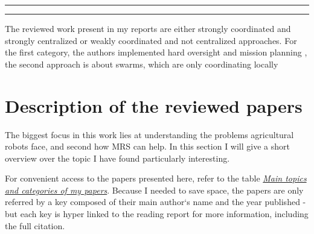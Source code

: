         \vspace{10px}
        \hrule
        \vspace{10px}


        \vspace{10px}
        \hrule
        \vspace{10px}

        The reviewed work present in my reports are either strongly coordinated and strongly centralized or weakly coordinated and not centralized approaches. For the first category, the authors implemented hard oversight and mission planning \cite{deSantos2016}, the second approach is about swarms, which are only coordinating locally \cite{Albani2019}



    \chapter{Description of the reviewed papers}

    The biggest focus in this work lies at understanding the problems agricultural robots face, and second how MRS can help. In this section I will give a short overview over the topic I have found particularly interesting. 
    
    For convenient access to the papers presented here, refer to the table \hyperref[table:main_topics]{\emph{Main topics and categories of my papers}}. Because I needed to save space, the papers are only referred by a key composed of their main author`s name and the year published - but each key is hyper linked to the reading report for more information, including the full citation.


